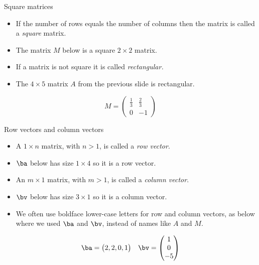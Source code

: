 \documentclass{beamer}
\begin{document}

\begin{frame}{Square matrices}

\begin{itemize}
\item If the number of rows equals the number of columns then the matrix is
called a \emph{square} matrix.
\item The matrix $M$ below is a square $2\times 2$ matrix.
\item If a matrix is not square it is called \emph{rectangular.}
\item The $4\times 5$ matrix $A$ from the previous slide is rectangular.
\end{itemize}

$$
M =
\begin{pmatrix}
\frac{1}{3} & \frac{2}{3} \\
0 & -1
\end{pmatrix}
$$

\end{frame}


\begin{frame}{Row vectors and column vectors}

\begin{itemize}
\item A $1\times n$ matrix, with $n>1$, is called a \emph{row vector}.
\item $\ba$ below has size $1\times 4$ so it is a row vector.
\item An $m\times 1$ matrix, with $m>1$, is called a \emph{column vector}.
\item $\bv$ below has size $3\times 1$ so it is a column vector.
\item We often use boldface lower-case letters for row and column vectors,
as below where we used $\ba$ and $\bv$,
instead of names like $A$ and $M$.
\end{itemize}

$$
\begin{matrix}
\ba =
\begin{pmatrix}
2, 2, 0, 1
\end{pmatrix}

&

\bv =
\begin{pmatrix}
1 \\
0 \\
-5
\end{pmatrix}
\end{matrix}
$$

\end{frame}
\end{document}
